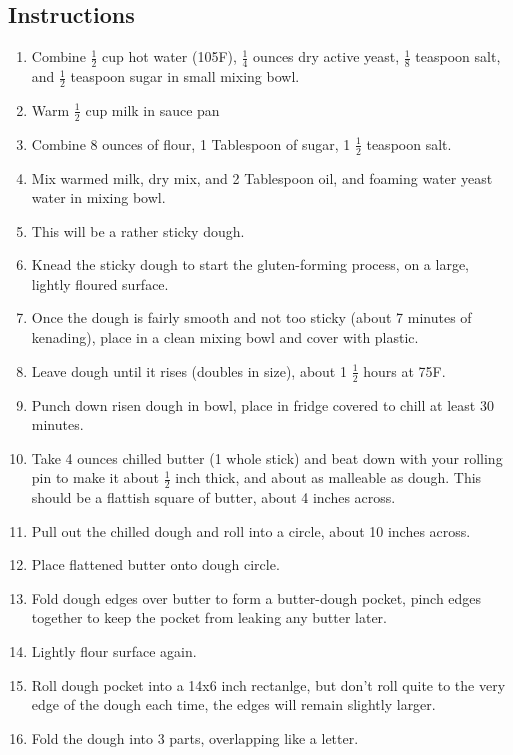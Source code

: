 \begin{multicols}{2}
\subsection*{Instructions}
\begin{enumerate}
    \item Combine \( \frac{1}{2} \) cup hot water (105F), \( \frac{1}{4} \) ounces dry active yeast, \( \frac{1}{8} \) teaspoon salt, and \( \frac{1}{2} \) teaspoon sugar in small mixing bowl.
    \item Warm \( \frac{1}{2} \) cup milk in sauce pan
    \item Combine 8 ounces of flour, 1 Tablespoon of sugar, 1 \( \frac{1}{2} \) teaspoon salt.
    \item Mix warmed milk, dry mix, and 2 Tablespoon oil, and foaming water yeast water in mixing bowl.
    \item This will be a rather sticky dough.
    \item Knead the sticky dough to start the gluten-forming process, on a large, lightly floured surface.
    \item Once the dough is fairly smooth and not too sticky (about 7 minutes of kenading), place in a clean mixing bowl and cover with plastic.
    \item Leave dough until it rises (doubles in size), about 1 \( \frac{1}{2} \) hours at 75F.
    \item Punch down risen dough in bowl, place in fridge covered to chill at least 30 minutes.
    \item Take 4 ounces chilled butter (1 whole stick) and beat down with your rolling pin to make it about \( \frac{1}{2} \) inch thick, and about as malleable as dough. This should be a flattish square of butter, about 4 inches across.
    \item Pull out the chilled dough and roll into a circle, about 10 inches across.
    \item Place flattened butter onto dough circle.
    \item Fold dough edges over butter to form a butter-dough pocket, pinch edges together to keep the pocket from leaking any butter later.
    \item Lightly flour surface again.
    \item Roll dough pocket into a 14x6 inch rectanlge, but don't roll quite to the very edge of the dough each time, the edges will remain slightly larger.
    \item Fold the dough into 3 parts, overlapping like a letter.

\end{enumerate}
\end{multicols}
